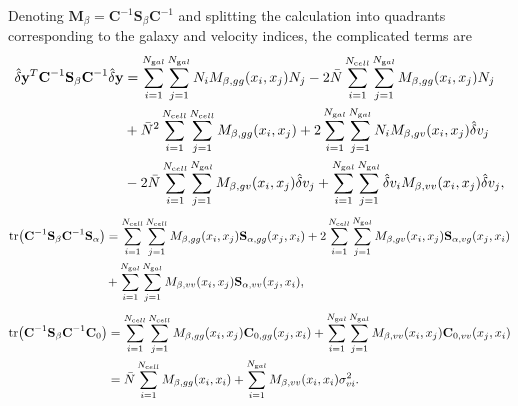 \documentclass{article}
\begin{document}
Denoting $\textbf{M}_\beta = \textbf{C}^{-1} \textbf{S}_\beta \textbf{C}^{-1}$ and splitting the calculation into quadrants  corresponding to the galaxy and velocity indices,
the complicated terms are
\begin{align*}
\hat{\delta} \textbf{y}^T \textbf{C}^{-1} \textbf{S}_\beta \textbf{C}^{-1} \hat{\delta} \textbf{y}  
&= \sum_{i=1}^{N_{\text gal}}  \sum_{j=1}^{N_{\text gal}} N_i M_{\beta,gg}(x_i,x_j) N_j 
 - 2\bar{N}   \sum_{i=1}^{N_{\text cell}} \sum_{j=1}^{N_{\text gal}}  M_{\beta,gg}(x_i,x_j) N_j \\
& +\bar{N}^2 \sum_{i=1}^{N_{\text cell}} \sum_{j=1}^{N_{\text cell}}  M_{\beta,gg}(x_i,x_j) 
 +   2 \sum_{i=1}^{N_{\text gal}}  \sum_{j=1}^{N_{\text gal}}  N_i M_{\beta,gv}(x_i,x_j) \hat{\delta} v_j  \\
& -   2 \bar{N}  \sum_{i=1}^{N_{\text cell}} \sum_{j=1}^{N_{\text gal}}  M_{\beta,gv}(x_i,x_j) \hat{\delta} v_j 
+ \sum_{i=1}^{N_{\text gal}}  \sum_{j=1}^{N_{\text gal}}  \hat{\delta} v_i M_{\beta,vv}(x_i,x_j) \hat{\delta} v_j ,
\end{align*}
\begin{align*}
\tr (\textbf{C}^{-1} \textbf{S}_\beta \textbf{C}^{-1} \textbf{S}_\alpha) & 
=  \sum_{i=1}^{N_{\text cell}} \sum_{j=1}^{N_{\text cell}} M_{\beta,gg}(x_i,x_j)\textbf{S}_{\alpha,gg}(x_j,x_i)  +  2 \sum_{i=1}^{N_{\text cell}} \sum_{j=1}^{N_{\text gal}} M_{\beta,gv}(x_i,x_j)\textbf{S}_{\alpha,vg} (x_j,x_i)\\
& + \sum_{i=1}^{N_{\text gal}} \sum_{j=1}^{N_{\text gal}} M_{\beta,vv}(x_i,x_j) \textbf{S}_{\alpha,vv}(x_j,x_i),
\end{align*}
\begin{align*}
\tr (\textbf{C}^{-1} \textbf{S}_\beta \textbf{C}^{-1} \textbf{C}_0) & 
=  \sum_{i=1}^{N_{\text cell}} \sum_{j=1}^{N_{\text cell}} M_{\beta,gg}(x_i,x_j)\textbf{C}_{0,gg}(x_j,x_i)  + \sum_{i=1}^{N_{\text gal}} \sum_{j=1}^{N_{\text gal}} M_{\beta,vv}(x_i,x_j) \textbf{C}_{0,vv}(x_j,x_i)\\
 & 
= \bar{N} \sum_{i=1}^{N_{\text cell}} M_{\beta,gg}(x_i,x_i)  + \sum_{i=1}^{N_{\text gal}}  M_{\beta,vv}(x_i,x_i) \sigma^{2}_{vi} .
\end{align*}
\end{document}
